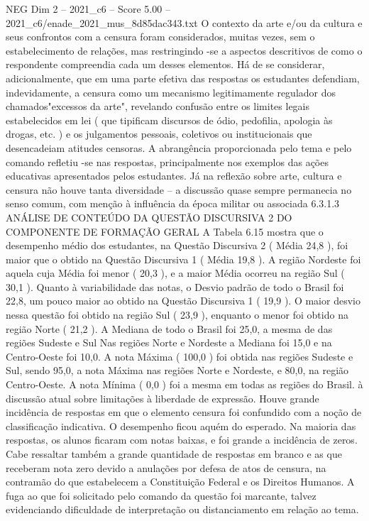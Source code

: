\begin{textsample}{NEG Dim 2 – 2021\_c6 – Score 5.00 – 2021\_c6/enade\_2021\_mus\_8d85dac343.txt}
O contexto da arte e/ou da cultura e seus confrontos com a censura foram considerados, muitas vezes, sem o estabelecimento de relações, mas restringindo -se a aspectos descritivos de como o respondente compreendia cada um desses elementos.
Há de se considerar, adicionalmente, que em uma parte efetiva das respostas os estudantes defendiam, indevidamente, a censura como um mecanismo legitimamente regulador dos chamados"excessos da arte", revelando confusão entre os limites legais estabelecidos em lei ( que tipificam discursos de ódio, pedofilia, apologia às drogas, etc. ) e os julgamentos pessoais, coletivos ou institucionais que desencadeiam atitudes censoras.
A abrangência proporcionada pelo tema e pelo comando refletiu -se nas respostas, principalmente nos exemplos das ações educativas apresentados pelos estudantes.
Já na reflexão sobre arte, cultura e censura não houve tanta diversidade – a discussão quase sempre permanecia no senso comum, com menção à influência da época militar ou associada 6.3.1.3 ANÁLISE DE CONTEÚDO DA QUESTÃO DISCURSIVA 2 DO COMPONENTE DE FORMAÇÃO GERAL A Tabela 6.15 mostra que o desempenho médio dos estudantes, na Questão Discursiva 2 ( Média 24,8 ), foi maior que o obtido na Questão Discursiva 1 ( Média 19,8 ).
A região Nordeste foi aquela cuja Média foi menor ( 20,3 ), e a maior Média ocorreu na região Sul ( 30,1 ).
Quanto à variabilidade das notas, o Desvio padrão de todo o Brasil foi 22,8, um pouco maior ao obtido na Questão Discursiva 1 ( 19,9 ).
O maior desvio nessa questão foi obtido na região Sul ( 23,9 ), enquanto o menor foi obtido na região Norte ( 21,2 ).
A Mediana de todo o Brasil foi 25,0, a mesma de das regiões Sudeste e Sul Nas regiões Norte e Nordeste a Mediana foi 15,0 e na Centro-Oeste foi 10,0.
A nota Máxima ( 100,0 ) foi obtida nas regiões Sudeste e Sul, sendo 95,0, a nota Máxima nas regiões Norte e Nordeste, e 80,0, na região Centro-Oeste.
A nota Mínima ( 0,0 ) foi a mesma em todas as regiões do Brasil. à discussão atual sobre limitações à liberdade de expressão.
Houve grande incidência de respostas em que o elemento censura foi confundido com a noção de classificação indicativa.
O desempenho ficou aquém do esperado.
Na maioria das respostas, os alunos ficaram com notas baixas, e foi grande a incidência de zeros.
Cabe ressaltar também a grande quantidade de respostas em branco e as que receberam nota zero devido a anulações por defesa de atos de censura, na contramão do que estabelecem a Constituição Federal e os Direitos Humanos.
A fuga ao que foi solicitado pelo comando da questão foi marcante, talvez evidenciando dificuldade de interpretação ou distanciamento em relação ao tema.

\end{textsample}
